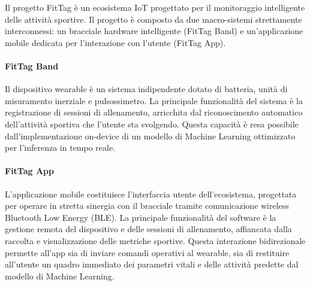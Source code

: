 Il progetto FitTag è un ecosistema IoT progettato per il monitoraggio intelligente delle attività sportive.
Il progetto è composto da due macro-sistemi strettamente interconnessi: un bracciale hardware intelligente (FitTag Band) e un'applicazione mobile dedicata per l'interazione con l'utente (FitTag App).

\paragraph{FitTag Band}
Il dispositivo wearable è un sistema indipendente dotato di batteria, unità di misuramento inerziale e pulsossimetro.
La principale funzionalità del sistema è la registrazione di sessioni di allenamento, arricchita dal riconoscimento automatico dell'attività sportiva che l'utente sta svolgendo.
Questa capacità è resa possibile dall'implementazione on-device di un modello di Machine Learning ottimizzato per l'inferenza in tempo reale.

\paragraph{FitTag App}
L'applicazione mobile costituisce l'interfaccia utente dell'ecosistema, progettata per operare in stretta sinergia con il bracciale tramite comunicazione wireless Bluetooth Low Energy (BLE).
La principale funzionalità del software è la gestione remota del dispositivo e delle sessioni di allenamento, affiancata dalla raccolta e visualizzazione delle metriche sportive.
Questa interazione bidirezionale permette all'app sia di inviare comandi operativi al wearable, sia di restituire all'utente un quadro immediato dei parametri vitali e delle attività predette dal modello di Machine Learning.